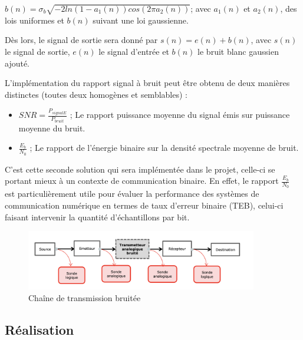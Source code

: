 \vspace{12pt}

$b(n)=\sigma_b\sqrt{-2ln(1-a_1(n))cos(2\pi a_2(n))}$; avec $a_1(n)$ et $a_2(n)$, des lois uniformes et $b(n)$ suivant une loi gaussienne. 

\vspace{12pt}

Dès lors, le signal de sortie sera donné par $s(n)=e(n)+b(n)$, avec $s(n)$ le signal de sortie, $e(n)$ le signal d'entrée et $b(n)$ le bruit blanc gaussien ajouté.

L'implémentation du rapport signal à bruit peut être obtenu de deux manières distinctes (toutes deux homogènes et semblables) :

\vspace{12pt}

\begin{itemize}
    \item $SNR=\frac{P_{signalE}}{P_{bruit}}$ ; Le rapport puissance moyenne du signal émis sur puissance moyenne du bruit.
    \item $\frac{E_b}{N_0}$ ; Le rapport de l'énergie binaire sur la densité spectrale moyenne de bruit.
\end{itemize}

\vspace{12pt}

C'est cette seconde solution qui sera implémentée dans le projet, celle-ci se portant mieux à un contexte de communication binaire. En effet, le rapport $\frac{E_b}{N_0}$ est particulièrement utile pour évaluer la performance des systèmes de communication numérique en termes de taux d'erreur binaire (TEB), celui-ci faisant intervenir la quantité d’échantillons par bit.

\begin{figure}[H]
    \centering
    \includegraphics[width=0.9\textwidth]{img/etape2_chaine_transmission_bruitee.png}
    \caption{Chaîne de transmission bruitée}
    \label{fig:chaine_transmission_bruitee}
\end{figure}

\subsection{Réalisation}


